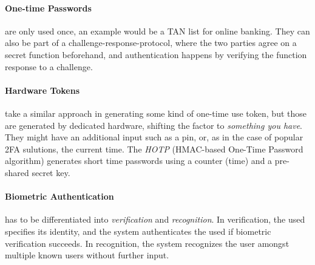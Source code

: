 \paragraph{One-time Passwords} are only used once, an example would be a TAN
list for online banking. They can also be part of a challenge-response-protocol,
where the two parties agree on a secret function beforehand, and authentication
happens by verifying the function response to a challenge.

\paragraph{Hardware Tokens} take a similar approach in generating some kind of
one-time use token, but those are generated by dedicated hardware, shifting the
factor to \textit{something you have}. They might have an additional input such
as a pin, or, as in the case of popular 2FA sulutions, the current time. The
\emph{HOTP} (HMAC-based One-Time Password algorithm) generates short time
passwords using a counter (time) and a pre-shared secret key.

\paragraph{Biometric Authentication} has to be differentiated into
\textit{verification} and \textit{recognition}. In verification, the used
specifies its identity, and the system authenticates the used if biometric
verification succeeds. In recognition, the system recognizes the user amongst
multiple known users without further input.


